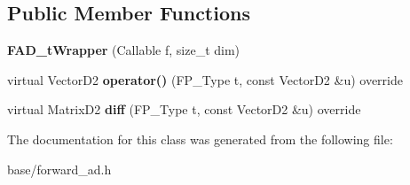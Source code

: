 \subsection*{Public Member Functions}
\begin{DoxyCompactItemize}
\item 
\mbox{\label{classFAD__tWrapper_adf109515e54d838f27bc1f523331ac25}} 
{\bfseries F\+A\+D\+\_\+t\+Wrapper} (Callable f, size\+\_\+t dim)
\item 
\mbox{\label{classFAD__tWrapper_ad0b635d7fc6f214d870ae4d03762612e}} 
virtual Vector\+D2 {\bfseries operator()} (F\+P\+\_\+\+Type t, const Vector\+D2 \&u) override
\item 
\mbox{\label{classFAD__tWrapper_aca8b9ccaf25becd93620776d404f20d8}} 
virtual Matrix\+D2 {\bfseries diff} (F\+P\+\_\+\+Type t, const Vector\+D2 \&u) override
\end{DoxyCompactItemize}


The documentation for this class was generated from the following file\+:\begin{DoxyCompactItemize}
\item 
base/forward\+\_\+ad.\+h\end{DoxyCompactItemize}

